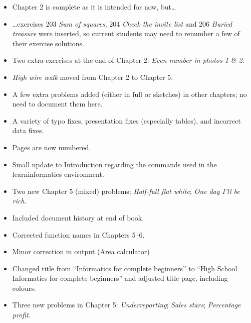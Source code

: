 {\begin{itemize}
  \item Chapter 2 is complete as it is intended for now, but\dots
  \item \dots exercises 203 \emph{Sum of squares}, 204 \emph{Check the invite list} and 206
    \emph{Buried treasure} were inserted, so current students may need to renumber a few
    of their exercise solutions.
  \item Two extra exercises at the end of Chapter 2: \emph{Even number in photos 1 \& 2}.
  \item \emph{High wire walk} moved from Chapter 2 to Chapter 5.
  \item A few extra problems added (either in full or sketches) in other chapters; no need
    to document them here.
  \item A variety of typo fixes, presentation fixes (especially tables), and incorrect
    data fixes.
  \item Pages are now numbered.
  \item Small update to Introduction regarding the commands used in the
    \textsf{learninformatics} environment.
\end{itemize}

\begin{itemize}
  \item Two new Chapter 5 (mixed) problems: \emph{Half-full flat white};
    \emph{One day I'll be rich}.
\end{itemize}

\begin{itemize}
  \item Included document history at end of book.
  \item Corrected function names in Chapters 5--6.
  \item Minor correction in output (Area calculator)
\end{itemize}

\begin{itemize}
  \item Changed title from ``Informatics for complete beginners'' to ``High School
    Informatics for complete beginners'' and adjusted title page, including colours.
  \item Three new problems in Chapter 5: \emph{Underreporting}; \emph{Sales stars};
    \emph{Percentage profit}.
\end{itemize}

}
